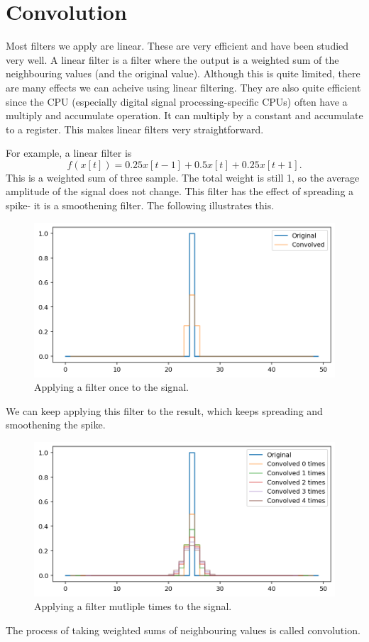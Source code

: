 \documentclass[a4paper, openany]{memoir}
\begin{document}
\section{Convolution}
Most filters we apply are linear. These are very efficient and have been studied very well. A linear filter is a filter where the output is a weighted sum of the neighbouring values (and the original value). Although this is quite limited, there are many effects we can acheive using linear filtering. They are also quite efficient since the CPU (especially digital signal processing-specific CPUs) often have a multiply and accumulate operation. It can multiply by a constant and accumulate to a register. This makes linear filters very straightforward.

For example, a linear filter is
\[f(x[t]) = 0.25x[t-1] + 0.5x[t] + 0.25x[t+1].\]
This is a weighted sum of three sample. The total weight is still 1, so the average amplitude of the signal does not change. This filter has the effect of spreading a spike- it is a smoothening filter. The following illustrates this.
\begin{figure}[H]
    \centering
    \includegraphics[scale=0.6]{src/6.11 convolved once.png}
    \caption{Applying a filter once to the signal.}
\end{figure}
\noindent We can keep applying this filter to the result, which keeps spreading and smoothening the spike.
\begin{figure}[H]
    \centering
    \includegraphics[scale=0.6]{src/6.12 convolved multiple.png}
    \caption{Applying a filter mutliple times to the signal.}
\end{figure}
\noindent The process of taking weighted sums of neighbouring values is called convolution.
\end{document}
